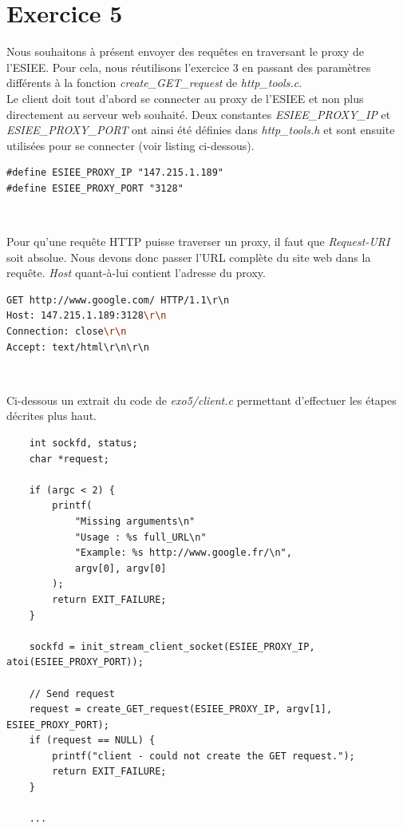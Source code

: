 \section{Exercice 5}
Nous souhaitons à présent envoyer des requêtes en traversant le proxy de l'ESIEE. Pour cela, nous réutilisons l'exercice 3 en passant des paramètres différents à la fonction \emph{create\_GET\_request} de \emph{http\_tools.c}.\\

Le client doit tout d'abord se connecter au proxy de l'ESIEE et non plus directement au serveur web souhaité. Deux constantes \emph{ESIEE\_PROXY\_IP} et \emph{ESIEE\_PROXY\_PORT} ont ainsi été définies dans \emph{http\_tools.h} et sont ensuite utilisées pour se connecter (voir listing ci-dessous).

\begin{lstlisting}[caption=Extrait de http\_tools.h]
#define ESIEE_PROXY_IP "147.215.1.189"
#define ESIEE_PROXY_PORT "3128"
\end{lstlisting}
\

Pour qu'une requête HTTP puisse traverser un proxy, il faut que \emph{Request-URI} soit absolue. Nous devons donc passer l'URL complète du site web dans la requête. \emph{Host} quant-à-lui contient l'adresse du proxy.

\begin{lstlisting}[caption=Exemple de requête en passant par le proxy de l'ESIEE, language=bash]
GET http://www.google.com/ HTTP/1.1\r\n
Host: 147.215.1.189:3128\r\n
Connection: close\r\n
Accept: text/html\r\n\r\n
\end{lstlisting}
\

\noindent Ci-dessous un extrait du code de \emph{exo5/client.c} permettant d'effectuer les étapes décrites plus haut.

\begin{lstlisting}
    int sockfd, status;
    char *request;

    if (argc < 2) {
        printf(
            "Missing arguments\n"
            "Usage : %s full_URL\n"
            "Example: %s http://www.google.fr/\n",
            argv[0], argv[0]
        );
        return EXIT_FAILURE;
    }

    sockfd = init_stream_client_socket(ESIEE_PROXY_IP, atoi(ESIEE_PROXY_PORT));

    // Send request
    request = create_GET_request(ESIEE_PROXY_IP, argv[1], ESIEE_PROXY_PORT);
    if (request == NULL) {
        printf("client - could not create the GET request.");
        return EXIT_FAILURE;
    }

    ...
\end{lstlisting}
\newpage

